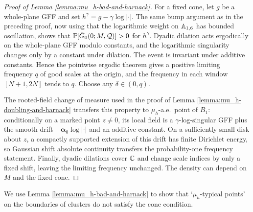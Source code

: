 \documentclass[12pt]{amsart}
\numberwithin{equation}{section}
\begin{document}
	\begin{proof}[Proof of Lemma \ref{lemma:mu_h-bad-and-harnack}]
		For a fixed cone, let $g$ be a whole-plane GFF and set $h^\gamma=g-\gamma\log|\cdot|$. The same bump argument as in the preceding proof, now using that the logarithmic weight on $\A_{1,6}$ has bounded oscillation, shows that $\P[\tilde G_0(0;M,\mathcal Q)]>0$ for $h^\gamma$. Dyadic dilation acts ergodically on the whole-plane GFF modulo constants, and the logarithmic singularity changes only by a constant under dilation. The event is invariant under additive constants. Hence the pointwise ergodic theorem gives a positive limiting frequency $q$ of good scales at the origin, and the frequency in each window $[N+1,2N]$ tends to $q$. Choose any $\delta\in(0,q)$.

		The rooted-field change of measure used in the proof of Lemma \ref{lemma:mu_h-doubling-and-harnack} transfers this property to $\mu_h$-a.e.\ point of $B_1$: conditionally on a marked point $z\ne0$, its local field is a $\gamma$-log-singular GFF plus the smooth drift $-\boldsymbol\alpha_0\log|\cdot|$ and an additive constant. On a sufficiently small disk about $z$, a compactly supported extension of this drift has finite Dirichlet energy, so Gaussian shift absolute continuity transfers the probability-one frequency statement. Finally, dyadic dilations cover $\C$ and change scale indices by only a fixed shift, leaving the limiting frequency unchanged. The density can depend on $M$ and the fixed cone.
	\end{proof}
	
	
	
	
	
	
	We use Lemma \ref{lemma:mu_h-bad-and-harnack} to show that `$\mu_h$-typical points' on the boundaries of clusters do not satisfy the cone condition. 
	
\end{document}
